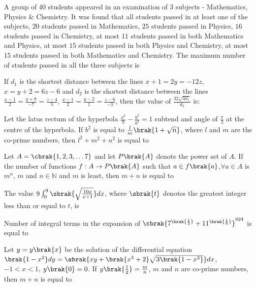 \iffalse
\title{JEE 2024}
\author{ee24btech11018}
\section{integer}
\fi
	\item A group of $40$ students appeared in an examination of $3$ subjects - Mathematics, Physics \& Chemistry. It was found that all students passed in at least one of the subjects, $20$ students passed in Mathematics, $25$ students passed in Physics, $16$ students passed in Chemistry, at most $11$ students passed in both Mathematics and Physics, at most $15$ students passed in both Physics and Chemistry, at most $15$ students passed in both Mathematics and Chemistry. The maximum number of students passed in all the three subjects is \hfill {}
	\item If $d_1$ is the shortest distance between the lines $x + 1 = 2y = -12z$, $x = y + 2 = 6z - 6$ and $d_2$ is the shortest distance between the lines $\frac{x-1}{2}=\frac{y+8}{-7}=\frac{z-4}{5}$, $\frac{x-1}{2}=\frac{y-2}{1}=\frac{z-6}{-3}$, then the value of $\frac{32\sqrt{3d_1}}{d_2}$ is: \hfill {}
	\item Let the latus rectum of the hyperbola $\frac{x^2}{9}-\frac{y^2}{b^2}=1$ subtend and angle of $\frac{\pi}{3}$ at the centre of the hyperbola. If $b^2$ is equal to $\frac{l}{m}\brak{1+\sqrt{n}}$, where $l$ and $m$ are the co-prime numbers, then $l^2+m^2+n^2$ is equal to \hfill {}
	\item Let $A = \cbrak{1, 2, 3, \dots 7}$ and let $P\brak{A}$ denote the power set of $A$. If the number of functions $f:A\to P\brak{A}$ such that $a\in f\brak{a}$,$\forall a\in A$ is $m^n$, $m$ and $n\in\mathbb{N}$ and $m$ is least, then $m+n$ is equal to \hfill {}
	\item The value $9\int_0^9\sbrak{\sqrt{\frac{10x}{x+1}}}dx$, where $\sbrak{t}$ denotes the greatest integer less than or equal to $t$, is  \hfill {}
	\item Number of integral terms in the expansion of $\cbrak{7^{\brak{\frac{1}{2}}}+11^{\brak{\frac{1}{6}}}}^{824}$ is equal to \hfill {}
	\item Let $y = y\brak{x}$ be the solution of the differential equation $\brak{1-x^2}dy=\sbrak{xy+\brak{x^3+2}\sqrt{3\brak{1-x^2}}}dx$, $-1<x<1$, $y\brak{0}=0$. If $y\brak{\frac{1}{2}}=\frac{m}{n}$, $m$ and $n$ are co-prime numbers, then $m+n$ is equal to \hfill {} 
